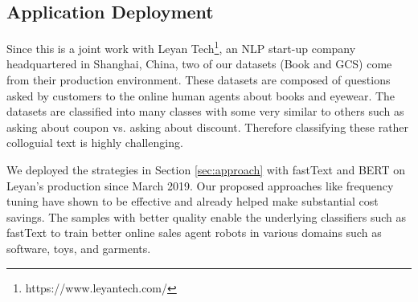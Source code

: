 

\subsection{Application Deployment}
Since this is a joint work with Leyan Tech\footnote{https://www.leyantech.com/}, an NLP start-up company 
headquartered in Shanghai, China, two of our datasets (Book and GCS) come 
from their production environment. These datasets are composed of questions 
asked by customers to the online human agents about books and eyewear. 
The datasets are classified into many classes with some very similar to 
others such as asking about coupon vs. asking about discount. Therefore
classifying these rather colloguial text is highly challenging.

We deployed the strategies in Section \ref{sec:approach} 
with fastText and BERT on Leyan's
production since March 2019. Our proposed approaches like frequency tuning 
have shown to be effective and already helped make substantial cost savings. 
The samples with better quality enable the underlying classifiers 
such as fastText to train better online sales agent robots 
in various domains such as software, toys, and garments.
